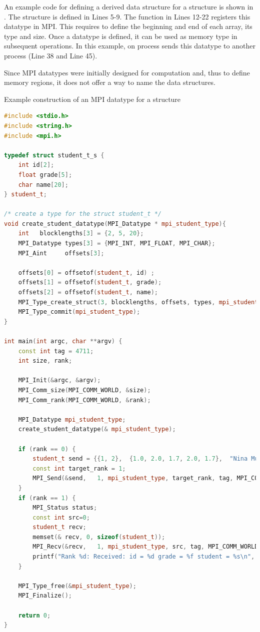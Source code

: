 \documentclass{../../template/esiwace-report}
\begin{document}
An example code for defining a derived data structure for a structure is shown in . 
The structure is defined in Lines 5-9.
The function in Lines 12-22 registers this datatype in MPI. 
This requires to define the beginning and end of each array, its type and size.
Once a datatype is defined, it can be used as memory type in subsequent operations.
In this example, on process sends this datatype to another process (Line 38 and Line 45).

Since MPI datatypes were initially designed for computation and, thus to define memory regions, it does not offer a way to name the data structures.

\begin{tcbcode}[label={lst:mpi-struct}]{Example construction of an MPI datatype for a structure}
\begin{lstlisting}[language=c++,morekeywords={{student_t}}]
#include <stdio.h>
#include <string.h>
#include <mpi.h>

typedef struct student_t_s {
    int id[2];
    float grade[5];
    char name[20];
} student_t;

/* create a type for the struct student_t */
void create_student_datatype(MPI_Datatype * mpi_student_type){    
    int   blocklengths[3] = {2, 5, 20};
    MPI_Datatype types[3] = {MPI_INT, MPI_FLOAT, MPI_CHAR};
    MPI_Aint     offsets[3];

    offsets[0] = offsetof(student_t, id) ;
    offsets[1] = offsetof(student_t, grade);
    offsets[2] = offsetof(student_t, name);
    MPI_Type_create_struct(3, blocklengths, offsets, types, mpi_student_type);
    MPI_Type_commit(mpi_student_type);
}

int main(int argc, char **argv) {
    const int tag = 4711;
    int size, rank;

    MPI_Init(&argc, &argv);
    MPI_Comm_size(MPI_COMM_WORLD, &size);
    MPI_Comm_rank(MPI_COMM_WORLD, &rank);

    MPI_Datatype mpi_student_type;
    create_student_datatype(& mpi_student_type);

    if (rank == 0) {
        student_t send = {{1, 2},  {1.0, 2.0, 1.7, 2.0, 1.7},  "Nina Musterfrau"};
        const int target_rank = 1;
        MPI_Send(&send,   1, mpi_student_type, target_rank, tag, MPI_COMM_WORLD);
    }
    if (rank == 1) {
        MPI_Status status;
        const int src=0;
        student_t recv;
        memset(& recv, 0, sizeof(student_t));
        MPI_Recv(&recv,   1, mpi_student_type, src, tag, MPI_COMM_WORLD, &status);
        printf("Rank %d: Received: id = %d grade = %f student = %s\n", rank, recv.id[0], recv.grade[0], recv.name);
    }

    MPI_Type_free(&mpi_student_type);
    MPI_Finalize();

    return 0;
}
\end{lstlisting}
\end{tcbcode}
\end{document}

